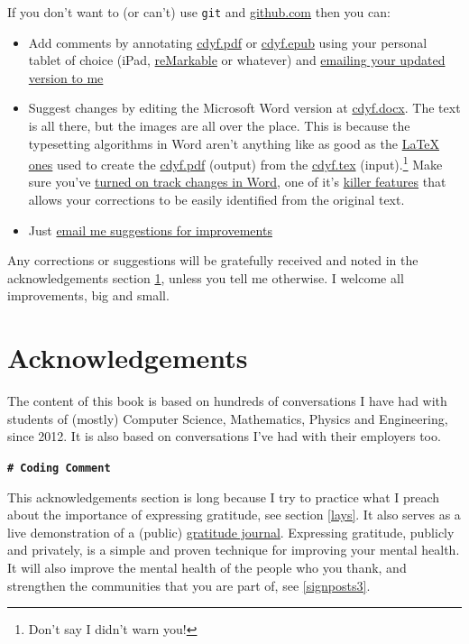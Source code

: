 \documentclass[
]{book}
\providecommand{\tightlist}{%
  \setlength{\itemsep}{0pt}\setlength{\parskip}{0pt}}
\begin{document}
If you don't want to (or can't) use \texttt{git} and \href{https://github.com/}{github.com} then you can:

\begin{itemize}
\tightlist
\item
  Add comments by annotating \href{https://www.cdyf.me/cdyf.pdf}{cdyf.pdf} or \href{https://cdyf.me/cdyf.epub}{cdyf.epub} using your personal tablet of choice (iPad, \href{https://en.wikipedia.org/wiki/ReMarkable}{reMarkable} or whatever) and \href{https://personalpages.manchester.ac.uk/staff/duncan.hull/contact}{emailing your updated version to me}
\item
  Suggest changes by editing the Microsoft Word version at \href{http://cdyf.me/cdyf.docx}{cdyf.docx}. The text is all there, but the images are all over the place. This is because the typesetting algorithms in Word aren't anything like as good as the \href{https://latex4year1.netlify.app/}{LaTeX ones} used to create the \href{https://www.cdyf.me/cdyf.pdf}{cdyf.pdf} (output) from the \href{https://github.com/dullhunk/cdyf/blob/master/_book/cdyf.tex}{cdyf.tex} (input).\footnote{Don't say I didn't warn you!} Make sure you've \href{https://support.microsoft.com/en-us/office/track-changes-in-word-197ba630-0f5f-4a8e-9a77-3712475e806a}{turned on track changes in Word}, one of it's \href{https://en.wikipedia.org/wiki/Killer_feature}{killer features} that allows your corrections to be easily identified from the original text.
\item
  Just \href{https://personalpages.manchester.ac.uk/staff/duncan.hull/contact}{email me suggestions for improvements}
\end{itemize}

Any corrections or suggestions will be gratefully received and noted in the acknowledgements section \ref{thanks}, unless you tell me otherwise. I welcome all improvements, big and small.

\hypertarget{thanks}{%
\section{Acknowledgements}\label{thanks}}

The content of this book is based on hundreds of conversations I have had with students of (mostly) Computer Science, Mathematics, Physics and Engineering, since 2012. It is also based on conversations I've had with their employers too.

\textbf{\texttt{\#\ Coding\ Comment}}

This acknowledgements section is long because I try to practice what I preach about the importance of expressing gratitude, see section \ref{lays}. It also serves as a live demonstration of a (public) \href{https://en.wikipedia.org/wiki/Gratitude_journal}{gratitude journal}. Expressing gratitude, publicly and privately, is a simple and proven technique for improving your mental health. It will also improve the mental health of the people who you thank, and strengthen the communities that you are part of, see \ref{signposts3}.
\end{document}

